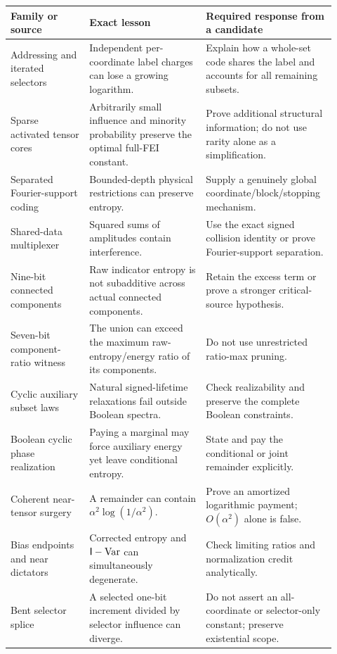 \documentclass[11pt]{article}
\newcommand{\Var}{\operatorname{Var}}\newcommand{\wh}[1]{\widehat{#1}}
\begin{document}
\begin{longtable}{>{\raggedright\arraybackslash}p{0.23\linewidth}>{\raggedright\arraybackslash}p{0.34\linewidth}>{\raggedright\arraybackslash}p{0.35\linewidth}}
\toprule
Family or source & Exact lesson & Required response from a candidate \\
\midrule\endhead
Addressing and iterated selectors & Independent per-coordinate label charges can lose a growing logarithm. & Explain how a whole-set code shares the label and accounts for all remaining subsets. \\
Sparse activated tensor cores & Arbitrarily small influence and minority probability preserve the optimal full-FEI constant. & Prove additional structural information; do not use rarity alone as a simplification. \\
Separated Fourier-support coding & Bounded-depth physical restrictions can preserve entropy. & Supply a genuinely global coordinate/block/stopping mechanism. \\
Shared-data multiplexer & Squared sums of amplitudes contain interference. & Use the exact signed collision identity or prove Fourier-support separation. \\
Nine-bit connected components & Raw indicator entropy is not subadditive across actual connected components. & Retain the excess term or prove a stronger critical-source hypothesis. \\
Seven-bit component-ratio witness & The union can exceed the maximum raw-entropy/energy ratio of its components. & Do not use unrestricted ratio-max pruning. \\
Cyclic auxiliary subset laws & Natural signed-lifetime relaxations fail outside Boolean spectra. & Check realizability and preserve the complete Boolean constraints. \\
Boolean cyclic phase realization & Paying a marginal may force auxiliary energy yet leave conditional entropy. & State and pay the conditional or joint remainder explicitly. \\
Coherent near-tensor surgery & A remainder can contain $\alpha^2\log(1/\alpha^2)$. & Prove an amortized logarithmic payment; $O(\alpha^2)$ alone is false. \\
Bias endpoints and near dictators & Corrected entropy and $\I-\Var$ can simultaneously degenerate. & Check limiting ratios and normalization credit analytically. \\
Bent selector splice & A selected one-bit increment divided by selector influence can diverge. & Do not assert an all-coordinate or selector-only constant; preserve existential scope. \\

\end{longtable}
\end{document}
